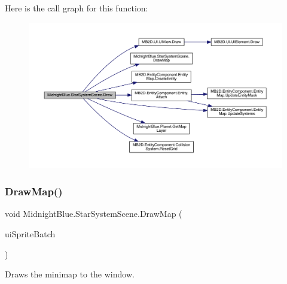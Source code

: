 Here is the call graph for this function\+:\nopagebreak
\begin{figure}[H]
\begin{center}
\leavevmode
\includegraphics[width=350pt]{class_midnight_blue_1_1_star_system_scene_ac3d90fb8d914d15b912f5da3cc1aa8a0_cgraph}
\end{center}
\end{figure}
\hypertarget{class_midnight_blue_1_1_star_system_scene_a8ce5e552f65d43e0326644e069dc6c24}{}\label{class_midnight_blue_1_1_star_system_scene_a8ce5e552f65d43e0326644e069dc6c24} 
\subsubsection{\texorpdfstring{Draw\+Map()}{DrawMap()}}
{\footnotesize\ttfamily void Midnight\+Blue.\+Star\+System\+Scene.\+Draw\+Map (\begin{DoxyParamCaption}\item[{Sprite\+Batch}]{ui\+Sprite\+Batch }\end{DoxyParamCaption})\hspace{0.3cm}{\ttfamily [inline]}}



Draws the minimap to the window. 


